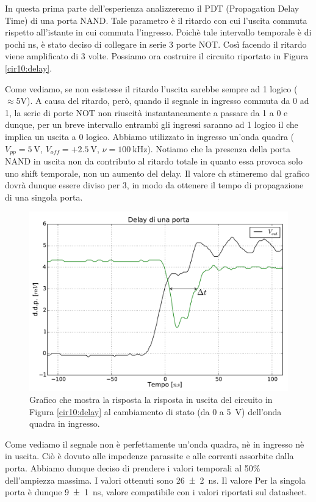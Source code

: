 In questa prima parte dell'esperienza analizzeremo il PDT (Propagation Delay Time) di una porta NAND.
Tale parametro è il ritardo con cui l'uscita commuta rispetto all'istante in cui commuta l'ingresso.
Poichè tale intervallo temporale è di pochi \si{\nano\second}, è stato deciso di collegare in serie 3 porte NOT.
Così facendo il ritardo viene amplificato di 3 volte.
Possiamo ora costruire il circuito riportato in Figura \ref{cir10:delay}.

Come vediamo, se non esistesse il ritardo l'uscita sarebbe sempre ad 1 logico ($\approx 5 \si{\volt}$).
A causa del ritardo, però, quando il segnale in ingresso commuta da 0 ad 1, la serie di porte NOT non riuscità instantaneamente a passare da 1 a 0 e dunque, per un breve intervallo entrambi gli ingressi saranno ad 1 logico il che implica un uscita a 0 logico.
Abbiamo utilizzato in ingresso un'onda quadra ($V_{pp}=\SI{5}{\volt}$, $V_{off}=+\SI{2.5}{\volt}$, $\nu=\SI{100}{\kilo\hertz}$).
Notiamo che la presenza della porta NAND in uscita non da contributo al ritardo totale in quanto essa provoca solo uno shift temporale, non un aumento del delay.
Il valore ch stimeremo dal grafico dovrà dunque essere diviso per 3, in modo da ottenere il tempo di propagazione di una singola porta.

\begin{figure}[htpc]
\centering
\includegraphics[width=.65\textwidth]{../E10/latex/gdelay.pdf}
\caption{Grafico che mostra la risposta la risposta in uscita del circuito in Figura \ref{cir10:delay} al cambiamento di stato (da 0 a \SI{5}{\V}) dell'onda quadra in ingresso.}
\label{gr10:delay}
\end{figure}

Come vediamo il segnale non è perfettamente un'onda quadra, nè in ingresso nè in uscita.
Ciò è dovuto alle impedenze parassite e alle correnti assorbite dalla porta.
Abbiamo dunque deciso di prendere i valori temporali al 50\% dell'ampiezza massima.
I valori ottenuti sono \SI{26\pm 2}{\nano\second}.
Il valore Per la singola porta è dunque \SI{9\pm 1}{\nano\second}, valore compatibile con i valori riportati sul datasheet.

